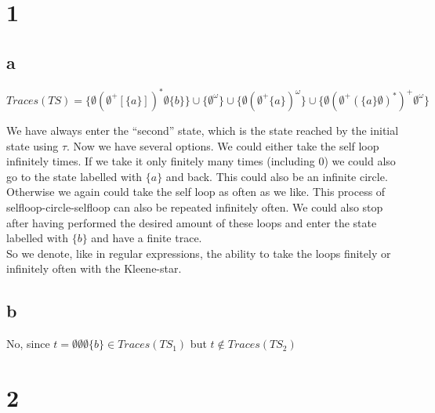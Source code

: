 \documentclass[11pt]{article}
\begin{document}
	
\section{1}
\subsection{a}

$Traces(TS) = \{\emptyset (\emptyset^+ [\{a\}])^* \emptyset \{b\}\} \cup \{\emptyset^\omega\} \cup \{\emptyset(\emptyset^+\{a\})^\omega\} \cup \{\emptyset(\emptyset^+(\{a\}\emptyset)^*)^+\emptyset^\omega\}$

We have always enter the ``second'' state, which is the state reached by the initial state using $\tau$. Now we have several options. We could either take the self loop infinitely times. If we take it only finitely many times (including 0) we could also go to the state labelled with $\{a\}$ and back. This could also be an infinite circle. Otherwise we again could take the self loop as often as we like. This process of selfloop-circle-selfloop can also be repeated infinitely often. We could also stop after having performed the desired amount of these loops and enter the state labelled with $\{b\}$ and have a finite trace.\\
So we denote, like in regular expressions, the ability to take the loops finitely or infinitely often with the Kleene-star. 

\subsection{b}
No, since $t = \emptyset\emptyset\emptyset\{b\} \in Traces(TS_1)$ but $t \notin Traces(TS_2)$
\section{2}
\end{document}
